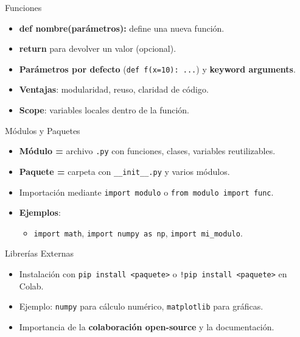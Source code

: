 \documentclass[10pt]{beamer}
\begin{document}
\begin{frame}{Funciones}
  \begin{itemize}
    \item \textbf{def nombre(parámetros):} define una nueva función.
    \item \textbf{return} para devolver un valor (opcional).
    \item \textbf{Parámetros por defecto} (\texttt{def f(x=10): ...}) y \textbf{keyword arguments}.
    \item \textbf{Ventajas}: modularidad, reuso, claridad de código.
    \item \textbf{Scope}: variables locales dentro de la función.
  \end{itemize}
\end{frame}

\begin{frame}{Módulos y Paquetes}
  \begin{itemize}
    \item \textbf{Módulo =} archivo \texttt{.py} con funciones, clases, variables reutilizables.
    \item \textbf{Paquete =} carpeta con \texttt{\_\_init\_\_.py} y varios módulos.
    \item Importación mediante \texttt{import modulo} o \texttt{from modulo import func}.
    \item \textbf{Ejemplos}:
      \begin{itemize}
        \item \texttt{import math}, \texttt{import numpy as np}, \texttt{import mi\_modulo}.
      \end{itemize}
  \end{itemize}
\end{frame}

\begin{frame}{Librerías Externas}
  \begin{itemize}
    \item Instalación con \texttt{pip install <paquete>} o \texttt{!pip install <paquete>} en Colab.
    \item Ejemplo: \texttt{numpy} para cálculo numérico, \texttt{matplotlib} para gráficas.
    \item Importancia de la \textbf{colaboración open-source} y la documentación.
  \end{itemize}
\end{frame}
\end{document}
